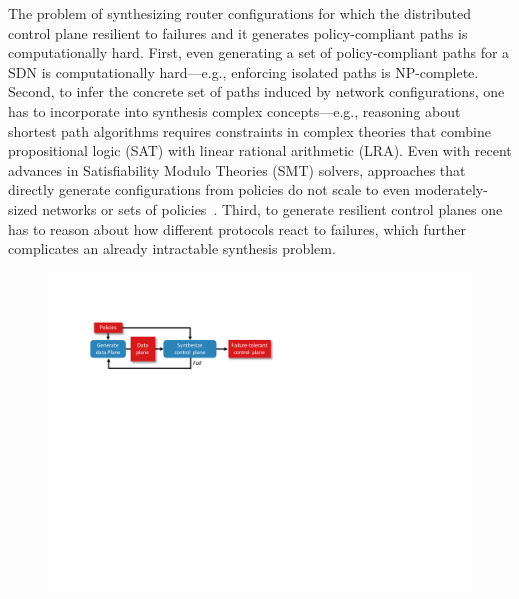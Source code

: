 The problem of synthesizing router configurations
for which the distributed control plane 
resilient to failures and it
generates policy-compliant paths 
is computationally hard. 
First, even generating a set of policy-compliant 
paths for a SDN  is 
computationally hard---e.g., enforcing isolated
paths is NP-complete. 
Second, to infer the concrete
set of paths induced by network configurations, 
one has to incorporate
into synthesis
complex concepts---e.g., reasoning about shortest path algorithms
requires constraints in complex
theories that combine propositional logic (SAT) 
with linear rational
arithmetic (LRA). Even with recent 
advances in Satisfiability Modulo Theories
(SMT) solvers, 
approaches that directly generate configurations  from policies
do not scale to
even moderately-sized networks or 
sets of policies~\cite{synet}.
Third, to generate resilient control planes one has to reason
about how different protocols react to failures, 
which further complicates an already intractable synthesis
problem. 

\begin{figure}
	\includegraphics[width=\linewidth]{figures/architecture.pdf}
	\label{fig:architecture}
\end{figure}

